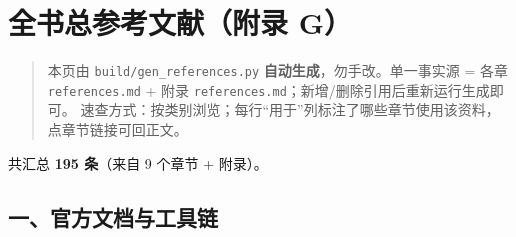 \chapter{全书总参考文献（附录
G）}\label{ux5168ux4e66ux603bux53c2ux8003ux6587ux732eux9644ux5f55-g}

\begin{quote}
本页由 \texttt{build/gen\_references.py}
\textbf{自动生成}，勿手改。单一事实源 = 各章 \texttt{references.md} +
附录 \texttt{references.md}；新增/删除引用后重新运行生成即可。
速查方式：按类别浏览；每行``用于''列标注了哪些章节使用该资料，点章节链接可回正文。
\end{quote}

共汇总 \textbf{195 条}（来自 9 个章节 + 附录）。

\section{一、官方文档与工具链}\label{ux4e00ux5b98ux65b9ux6587ux6863ux4e0eux5de5ux5177ux94fe}

